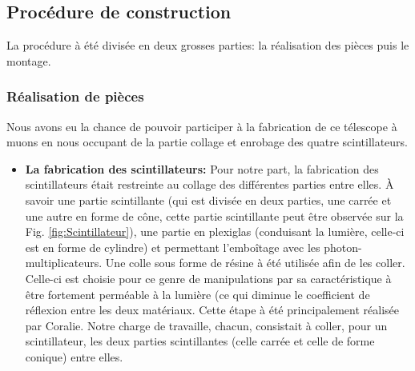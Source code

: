 \documentclass[12pt]{article}
\begin{document}
\subsection{Procédure de construction}
La procédure à été divisée en deux grosses parties: la réalisation des pièces puis le montage. 

\subsubsection{Réalisation de pièces}
Nous avons eu la chance de pouvoir participer à la fabrication de ce télescope à muons en nous occupant de la partie collage et enrobage des quatre scintillateurs. 

\begin{itemize}
    \item \textbf{La fabrication des scintillateurs: } Pour notre part, la fabrication des scintillateurs était restreinte au collage des différentes parties entre elles. À savoir une partie scintillante (qui est divisée en deux parties, une carrée et une autre en forme de cône, cette partie scintillante peut être observée sur la Fig. \ref{fig:Scintillateur}),  une partie en plexiglas (conduisant la lumière, celle-ci est en forme de cylindre) et permettant l'emboîtage avec les photon-multiplicateurs. Une colle sous forme de résine à été utilisée afin de les coller. Celle-ci est choisie pour ce genre de manipulations par sa caractéristique à être fortement perméable à la lumière (ce qui diminue le coefficient de réflexion entre les deux matériaux. Cette étape à été principalement réalisée par Coralie. Notre charge de travaille, chacun, consistait à coller, pour un scintillateur, les deux parties scintillantes (celle carrée et celle de forme conique) entre elles. 
    

\end{itemize}
\end{document}
